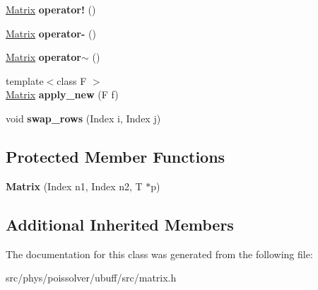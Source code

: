 \begin{DoxyCompactItemize}
\item 
\hyperlink{classcpt_1_1Matrix}{Matrix} {\bfseries operator!} ()\hypertarget{classcpt_1_1Matrix_3_01T_00_012_01_4_af7dd074167dc168c8e32dc569a18e6de}{}\label{classcpt_1_1Matrix_3_01T_00_012_01_4_af7dd074167dc168c8e32dc569a18e6de}

\item 
\hyperlink{classcpt_1_1Matrix}{Matrix} {\bfseries operator-\/} ()\hypertarget{classcpt_1_1Matrix_3_01T_00_012_01_4_afde05a59963303a84f8e0a68217d8760}{}\label{classcpt_1_1Matrix_3_01T_00_012_01_4_afde05a59963303a84f8e0a68217d8760}

\item 
\hyperlink{classcpt_1_1Matrix}{Matrix} {\bfseries operator$\sim$} ()\hypertarget{classcpt_1_1Matrix_3_01T_00_012_01_4_a7e2674cdb57d47786d85d75a5db959e5}{}\label{classcpt_1_1Matrix_3_01T_00_012_01_4_a7e2674cdb57d47786d85d75a5db959e5}

\item 
{\footnotesize template$<$class F $>$ }\\\hyperlink{classcpt_1_1Matrix}{Matrix} {\bfseries apply\+\_\+new} (F f)\hypertarget{classcpt_1_1Matrix_3_01T_00_012_01_4_aad3a5060e3b2d1cfa2338b19776710b7}{}\label{classcpt_1_1Matrix_3_01T_00_012_01_4_aad3a5060e3b2d1cfa2338b19776710b7}

\item 
void {\bfseries swap\+\_\+rows} (Index i, Index j)\hypertarget{classcpt_1_1Matrix_3_01T_00_012_01_4_a74ed23378657852a6acf553660981ba2}{}\label{classcpt_1_1Matrix_3_01T_00_012_01_4_a74ed23378657852a6acf553660981ba2}

\end{DoxyCompactItemize}
\subsection*{Protected Member Functions}
\begin{DoxyCompactItemize}
\item 
{\bfseries Matrix} (Index n1, Index n2, T $\ast$p)\hypertarget{classcpt_1_1Matrix_3_01T_00_012_01_4_a7675d925eb70d2e3030b0ce19b085f1d}{}\label{classcpt_1_1Matrix_3_01T_00_012_01_4_a7675d925eb70d2e3030b0ce19b085f1d}

\end{DoxyCompactItemize}
\subsection*{Additional Inherited Members}


The documentation for this class was generated from the following file\+:\begin{DoxyCompactItemize}
\item 
src/phys/poissolver/ubuff/src/matrix.\+h\end{DoxyCompactItemize}
